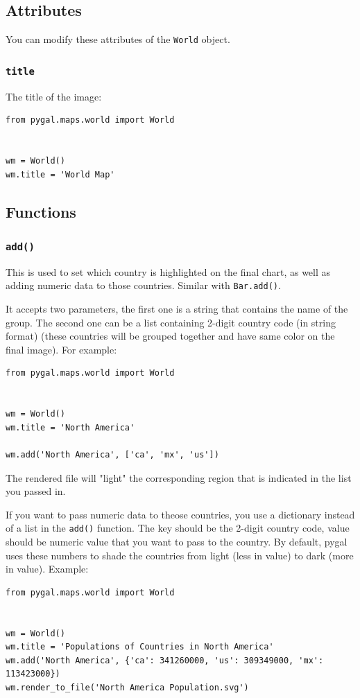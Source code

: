 \documentclass[12pt]{book}
\begin{document}
\subsection{Attributes}
\label{sec:org00a1af8}
You can modify these attributes of the \texttt{World} object.
\subsubsection{\texttt{title}}
\label{sec:orgd9b7172}
The title of the image:
\begin{verbatim}
from pygal.maps.world import World


wm = World()
wm.title = 'World Map'
\end{verbatim}

\subsection{Functions}
\label{sec:org39beefe}
\subsubsection{\texttt{add()}}
\label{sec:org39b0c8e}
This is used to set which country is highlighted on the final chart, as well as adding numeric data to those countries. Similar with \texttt{Bar.add()}.

It accepts two parameters, the first one is a string that contains the name of the group. The second one can be a list containing 2-digit country code (in string format) (these countries will be grouped together and have same color on the final image). For example:
\begin{verbatim}
from pygal.maps.world import World


wm = World()
wm.title = 'North America'

wm.add('North America', ['ca', 'mx', 'us'])
\end{verbatim}
The rendered file will "light" the corresponding region that is indicated in the list you passed in.

If you want to pass numeric data to theose countries, you use a dictionary instead of a list in the \texttt{add()} function. The key should be the 2-digit country code, value should be numeric value that you want to pass to the country. By default, pygal uses these numbers to shade the countries from light (less in value) to dark (more in value). Example:
\begin{verbatim}
from pygal.maps.world import World


wm = World()
wm.title = 'Populations of Countries in North America'
wm.add('North America', {'ca': 341260000, 'us': 309349000, 'mx': 113423000})
wm.render_to_file('North America Population.svg')
\end{verbatim}
\end{document}
